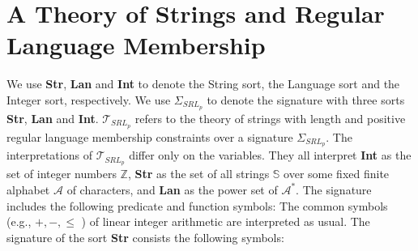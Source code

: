 \section{A Theory of Strings and Regular Language Membership}
\label{sec:Theories over Strings}
We use \textbf{Str}, \textbf{Lan} and \textbf{Int} to denote the String sort, the Language sort and the Integer sort, respectively. We use \( \Sigma_{SRL_p}\) to denote the signature with three sorts \textbf{Str}, \textbf{Lan} and \textbf{Int}. \(\mathcal{T}_{SRL_p}\) refers to the theory of strings with length and positive regular language membership constraints over a signature \( \Sigma_{SRL_p}\). The interpretations of \(\mathcal{T}_{SRL_p}\) differ only on the variables. They all interpret \textbf{Int} as the set of integer numbers  \(\mathbb{Z}\), \textbf{Str} as the set of all strings  \(\mathbb{S}\)  over some fixed finite alphabet  \(\mathcal{A}\) of characters, and \textbf{Lan} as the power set of \(\mathcal{A}^* \).
The signature includes the following predicate and function symbols:
The common symbols (e.g., \( + , - ,  \le \) ) of linear integer arithmetic are interpreted as usual. The signature of the sort \textbf{Str} consists the following symbols:


